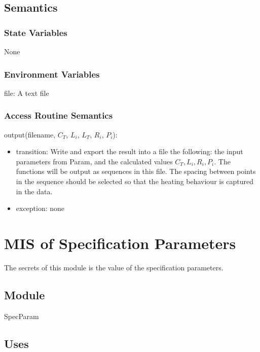 \documentclass[12pt, titlepage]{article}
\begin{document}
\subsection{Semantics}

\subsubsection{State Variables}

None

\subsubsection{Environment Variables}

file: A text file

\subsubsection{Access Routine Semantics}

\noindent output(filename, $C_T$, $L_i$, $L_T$, $R_i$, $P_i$):
\begin{itemize}
\item transition:  Write and export the result into a file the
  following: the input
    parameters from Param, and the calculated values $C_T, L_i, R_i,
    P_i$.  The functions will be output as
    sequences in this file.  The spacing between points in the sequence should
    be selected so that the heating behaviour is captured in the data.
\item exception: none
\end{itemize}

\newpage

\section{MIS of Specification Parameters} \label{SpecParam}

The secrets of this module is the value of the specification parameters.

\subsection{Module}

SpecParam

\subsection{Uses}
\end{document}
